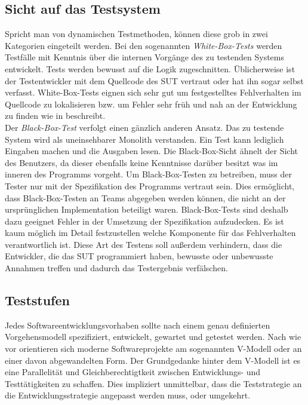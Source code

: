 \subsection{Sicht auf das Testsystem}
\label{sec:sicht}
Spricht man von dynamischen Testmethoden, können diese grob in zwei Kategorien eingeteilt werden. Bei den sogenannten \textit{White-Box-Tests} werden Testfälle mit Kenntnis über die internen Vorgänge des zu testenden Systems entwickelt. Tests werden bewusst auf die Logik zugeschnitten. Üblicherweise ist der Testentwickler mit dem Quellcode des \gls{SUT} vertraut oder hat ihn sogar selbst verfasst. White-Box-Tests eignen sich sehr gut um festgestelltes Fehlverhalten im Quellcode zu lokalisieren bzw. um Fehler sehr früh und nah an der Entwicklung zu finden wie \citeauthor{spillner_basiswissen_2012} in \cite{spillner_basiswissen_2012} beschreibt.\\
Der \textit{Black-Box-Test} verfolgt einen gänzlich anderen Ansatz. Das zu testende System wird als uneinsehbarer Monolith verstanden. Ein Test kann lediglich Eingaben machen und die Ausgaben lesen. Die Black-Box-Sicht  ähnelt der Sicht des Benutzers, da dieser ebenfalls keine Kenntnisse darüber besitzt was im inneren des Programms vorgeht. Um Black-Box-Testen zu betreiben, muss der Tester nur mit der Spezifikation des Programms vertraut sein. Dies ermöglicht, dass Black-Box-Testen an Teams abgegeben werden können, die nicht an der ursprünglichen Implementation beteiligt waren. Black-Box-Tests sind deshalb dazu geeignet Fehler in der Umsetzung der Spezifikation aufzudecken. Es ist kaum möglich im Detail festzustellen welche Komponente für das Fehlverhalten verantwortlich ist. Diese Art des Testens soll außerdem verhindern, dass die Entwickler, die das \gls{SUT} programmiert haben, bewusste oder unbewusste Annahmen treffen und dadurch das Testergebnis verfälschen\cite{spillner_basiswissen_2012}.  

\subsection{Teststufen}
\label{sec:teststufen}
Jedes Softwareentwicklungsvorhaben sollte nach einem genau definierten Vorgehensmodell spezifiziert, entwickelt, gewartet und getestet werden\cite{spillner_basiswissen_2012}. Nach wie vor orientieren sich moderne Softwareprojekte am sogenannten V-Modell\cite{boehm_verifying_1984} oder an einer davon abgewandelten Form. Der Grundgedanke hinter dem V-Modell ist es eine Parallelität und Gleichberechtigtkeit zwischen Entwicklungs- und Testtätigkeiten zu schaffen. Dies impliziert unmittelbar, dass die Teststrategie an die Entwicklungsstrategie angepasst werden muss, oder umgekehrt.\\

